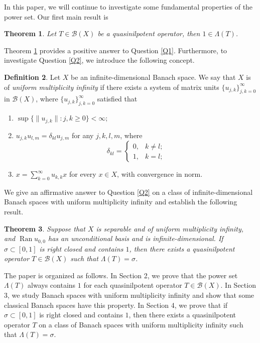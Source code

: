\documentclass[12pt]{amsart}
\numberwithin{equation}{section}
\theoremstyle{plain}
\newtheorem{thm}{Theorem}[section]
\theoremstyle{definition}
\newtheorem{defn}[thm]{Definition}
\newcommand{\B}{{\mathcal{B}}}
\newcommand{\ran}{\operatorname{Ran}}
\begin{document}
In this paper, we will continue to investigate some fundamental properties of the
power set.
Our first main result is
\begin{thm}\label{dlA}
Let $T\in\B(X)$ be a quasinilpotent operator, then $1\in\Lambda(T)$.
\end{thm}
Theorem \ref{dlA} provides a positive answer to Question \ref{Q1}.
Furthermore, to investigate Question \ref{Q2}, we introduce the following concept.
\begin{defn}\label{I:uniform}
Let $X$ be an infinite-dimensional Banach space.
We say that $X$ is of {\em uniform multiplicity infinity} if there exists a system of matrix units $\{u_{j,k}\}_{j,k=0}^{\infty}$ in $\B(X)$, where $\{u_{j,k}\}_{j,k=0}^{\infty}$ satisfied that
\begin{enumerate}
  \item [(a)]
  $\sup\{\|u_{j,k}\|:j,k\geq 0\}<\infty$;
  \item [(b)]
  $u_{j,k}u_{l,m}=\delta_{kl} u_{j,m}$ for any $j,k,l,m$, where
  $$\delta_{kl}=\begin{cases}0,&
  k\neq l;\\
  1, & k=l;\end{cases}$$
  \item [(c)]
  $x=\sum_{k=0}^{\infty}u_{k,k}x$ for every $x\in X$,
  with convergence in norm.
\end{enumerate}
\end{defn}
We give an affirmative answer to Question \ref{Q2} on a class of infinite-dimensional Banach spaces with uniform multiplicity infinity and establish the following result.

\begin{thm}\label{dlB}
Suppose that $X$ is separable and of uniform multiplicity infinity, and $\ran u_{0,0}$ has an unconditional basis and is infinite-dimensional.
If $\sigma\subset [0,1]$ is right closed and contains $1$, then there exists a quasinilpotent operator $T\in\B(X)$ such that $\Lambda(T)=\sigma$.
\end{thm}

The paper is organized as follows.
In Section 2, we prove that the power set $\Lambda(T)$ always contains $1$ for each quasinilpotent operator $T\in\B(X)$.
In Section 3, we study Banach spaces with uniform multiplicity infinity and show that some classical Banach spaces have this property.
In Section 4, we prove that if $\sigma\subset [0,1]$ is right closed and contains $1$, then there exists a quasinilpotent operator $T$ on a class of Banach spaces with uniform multiplicity infinity such that $\Lambda(T)=\sigma$.
\end{document}
